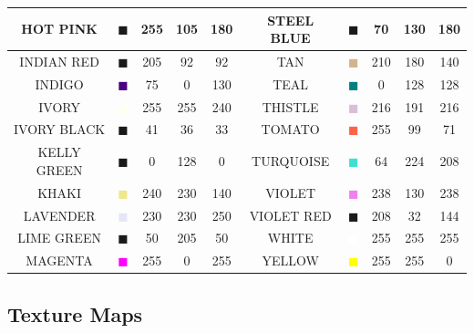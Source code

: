 \documentclass[11pt]{book}
\begin{document}
\begin{table}[p]
\begin{center}
\begin{tabular}{|c|c|c|c|c|c||c|c|c|c|}
{\ct HOT PINK} & \textcolor{HOT PINK} {$\blacksquare$} & 255& 105& 180& {\ct STEEL BLUE} &  \textcolor{STEEL BLUE} {$\blacksquare$} & 70& 130& 180  \\ \hline
{\ct INDIAN RED} & \textcolor{INDIAN RED} {$\blacksquare$} & 205& 92& 92& {\ct TAN} &  \textcolor{TAN} {$\blacksquare$} & 210& 180& 140  \\ \hline
{\ct INDIGO} & \textcolor{INDIGO} {$\blacksquare$} & 75& 0& 130& {\ct TEAL} &  \textcolor{TEAL} {$\blacksquare$} & 0& 128& 128  \\ \hline
{\ct IVORY} & \textcolor{IVORY} {$\blacksquare$} & 255& 255& 240& {\ct THISTLE} &  \textcolor{THISTLE} {$\blacksquare$} & 216& 191& 216  \\ \hline
{\ct IVORY BLACK} & \textcolor{IVORY BLACK} {$\blacksquare$} & 41& 36& 33& {\ct TOMATO } &  \textcolor{TOMATO } {$\blacksquare$} & 255& 99& 71  \\ \hline
{\ct KELLY GREEN} & \textcolor{KELLY GREEN} {$\blacksquare$} & 0& 128& 0& {\ct TURQUOISE} &  \textcolor{TURQUOISE} {$\blacksquare$} & 64& 224& 208  \\ \hline
{\ct KHAKI} & \textcolor{KHAKI} {$\blacksquare$} & 240& 230& 140& {\ct VIOLET} &  \textcolor{VIOLET} {$\blacksquare$} & 238& 130& 238  \\ \hline
{\ct LAVENDER} & \textcolor{LAVENDER} {$\blacksquare$} & 230& 230& 250& {\ct VIOLET RED} &  \textcolor{VIOLET RED} {$\blacksquare$} & 208& 32& 144  \\ \hline
{\ct LIME GREEN} & \textcolor{LIME GREEN} {$\blacksquare$} & 50& 205& 50& {\ct WHITE} &  \textcolor{WHITE} {$\blacksquare$} & 255& 255& 255  \\ \hline
{\ct MAGENTA} & \textcolor{MAGENTA} {$\blacksquare$} & 255& 0& 255& {\ct YELLOW} &  \textcolor{YELLOW} {$\blacksquare$} & 255& 255& 0  \\ \hline
\end{tabular}
\end{center}
\end{table}


\subsection{Texture Maps}
\label{info:texture_map}
\end{document}
